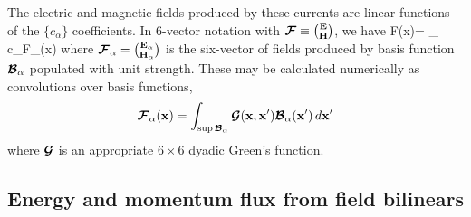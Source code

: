 \documentclass[letterpaper]{article}
\begin{document}
The electric and magnetic fields produced by these currents
are linear functions of the $\{c_\alpha\}$ coefficients.
In 6-vector notation with $\boldsymbol{\mathcal{F}}\equiv {\mathbf{E} \choose \mathbf{H}}$, we have
{ \bmc F(\vb x)=
   \sum_{\alpha} c_\alpha \bmc F_\alpha(\vb x)
}
where $\boldsymbol{\mathcal{F}}_\alpha={\mathbf{E}_\alpha \choose \mathbf{H}_\alpha}$ 
is the six-vector of fields produced by basis function $\boldsymbol{\mathcal{B}}_\alpha$ 
populated with unit strength. These may be calculated numerically
as convolutions over basis functions,
$$ \boldsymbol{\mathcal{F}}_\alpha(\mathbf{x})
   =\int_{\sup \boldsymbol{\mathcal{B}}_\alpha} \boldsymbol{\mathcal{G}}(\mathbf{x}, \mathbf{x}^\prime)
    \boldsymbol{\mathcal{B}}_\alpha(\mathbf{x}^\prime) \, d\mathbf{x}^\prime
$$
where $\boldsymbol{\mathcal{G}}$ is an appropriate $6\times 6$ dyadic Green's
function.

\subsection*{Energy and momentum flux from field bilinears}
\end{document}
